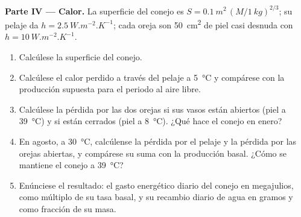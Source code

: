 \begin{problem}
\medskip
\noindent\textbf{Parte IV --- Calor.}
La superficie del conejo es $S = \qty{0.1}{m^2}\,(M/\qty{1}{kg})^{2/3}$; su
pelaje da $h = \qty{2.5}{W.m^{-2}.K^{-1}}$; cada oreja son \qty{50}{cm^2}
de piel casi desnuda con $h = \qty{10}{W.m^{-2}.K^{-1}}$.
\begin{enumerate}[resume]
  \item Calcúlese la superficie del conejo.
  \item Calcúlese el calor perdido a través del pelaje a \qty{5}{\celsius}
        y compárese con la producción supuesta para el periodo al aire
        libre.
  \item Calcúlese la pérdida por las dos orejas si sus vasos están
        abiertos (piel a \qty{39}{\celsius}) y si están cerrados (piel a
        \qty{8}{\celsius}). ¿Qué hace el conejo en enero?
  \item En agosto, a \qty{30}{\celsius}, calcúlense la pérdida por el
        pelaje y la pérdida por las orejas abiertas, y compárese su suma
        con la producción basal. ¿Cómo se mantiene el conejo a
        \qty{39}{\celsius}?
  \item Enúnciese el resultado: el gasto energético diario del conejo en
        megajulios, como múltiplo de su tasa basal, y su recambio diario
        de agua en gramos y como fracción de su masa.
\end{enumerate}
\end{problem}
